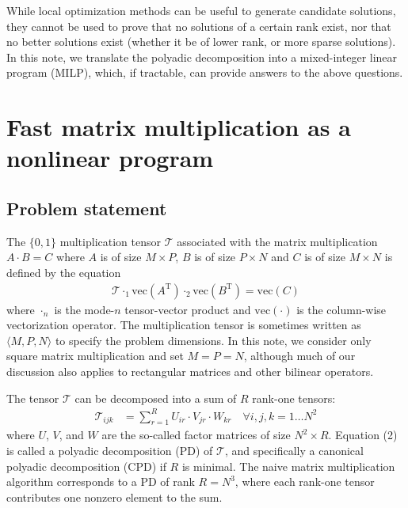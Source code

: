 \documentclass{article}
\begin{document}
While local optimization methods can be useful to generate candidate solutions, they cannot be used to prove that no solutions of a certain rank exist, nor that no better solutions exist (whether it be of lower rank, or more sparse solutions). In this note, we translate the polyadic decomposition into a mixed-integer linear program (MILP), which, if tractable, can provide answers to the above questions.

\section{Fast matrix multiplication as a nonlinear program}

\subsection{Problem statement}

The $\{0, 1\}$ multiplication tensor $\mathcal{T}$ associated with the matrix multiplication \mbox{$A\cdot B = C$} where $A$ is of size $M \times P$, $B$ is of size $P \times N$ and $C$ is of size $M \times N$ is defined by the equation
\begin{align}
    \label{eq:strassen}
    \mathcal{T} \cdot_1 \mathrm{vec}(A^\mathrm{T}) \cdot_2 \mathrm{vec}(B^\mathrm{T}) = \mathrm{vec}(C)
\end{align}
where $\cdot_n$ is the mode-$n$ tensor-vector product and $\mathrm{vec}(\cdot)$ is the column-wise vectorization operator. The multiplication tensor is sometimes written as $\langle M, P, N \rangle$ to specify the problem dimensions. In this note, we consider only square matrix multiplication and set $M = P = N$, although much of our discussion also applies to rectangular matrices and other bilinear operators.

The tensor $\mathcal{T}$ can be decomposed into a sum of $R$ rank-one tensors:
\begin{align}
    \label{eq:pd}
    \mathcal{T}_{ijk} &= \sum_{r=1}^R U_{ir} \cdot V_{jr} \cdot W_{kr} \quad \forall i,j,k=1 \ldots N^2
\end{align}
where $U$, $V$, and $W$ are the so-called factor matrices of size $N^2 \times R$. Equation (2) is called a polyadic decomposition (PD) of $\mathcal{T}$, and specifically a canonical polyadic decomposition (CPD) if $R$ is minimal. The naive matrix multiplication algorithm corresponds to a PD of rank $R = N^3$, where each rank-one tensor contributes one nonzero element to the sum.
\end{document}
